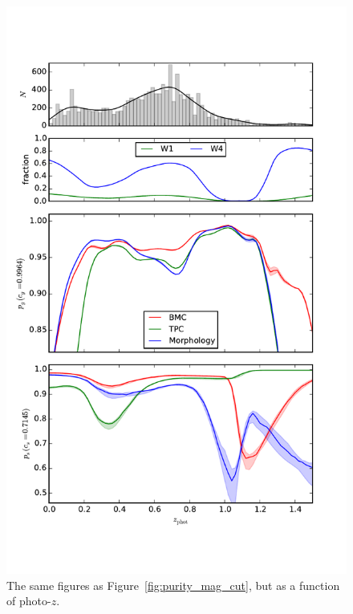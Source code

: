 \documentclass[useAMS,usenatbib]{mn2e}
\begin{document}
\begin{figure}
  \centering
  \includegraphics[width=\linewidth]{figures/purity_z_cut.pdf}
  \caption{The same figures as Figure~\ref{fig:purity_mag_cut},
           but as a function of photo-$z$.}
  \label{fig:purity_z_cut}
\end{figure}
\end{document}
